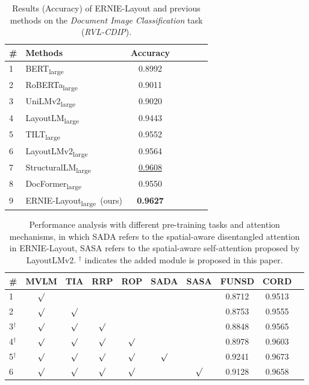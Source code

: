 \documentclass[11pt]{article}
\begin{document}
\begin{table}[t]
\centering
\small
\begin{tabular}{llccccc}
\toprule
\# & \textbf{Methods}                    & \textbf{Accuracy} \\
\midrule
1 & BERT\textsubscript{large} \cite{liu2019roberta} & 0.8992 \\
2 & RoBERTa\textsubscript{large} \cite{liu2019roberta} & 0.9011 \\
3 & UniLMv2\textsubscript{large} \cite{bao2020unilmv2} & 0.9020 \\
\midrule
4 & LayoutLM\textsubscript{large} \cite{xu2020layoutlm} & 0.9443 \\
5 & TILT\textsubscript{large} \cite{powalski2021going}  &  0.9552 \\
6 & LayoutLMv2\textsubscript{large} \cite{xu2021layoutlmv2} & 0.9564 \\
7 & StructuralLM\textsubscript{large} \cite{li2021structurallm} & \underline{0.9608} \\
8 & DocFormer\textsubscript{large}~\cite{appalaraju2021docformer} & 0.9550 \\
\midrule
\midrule
9 & ERNIE-Layout\textsubscript{large}~(ours) & \textbf{0.9627} \\ 
\bottomrule
\end{tabular}
\caption{Results (Accuracy) of ERNIE-Layout and previous methods on the \emph{Document Image Classification} task (\emph{RVL-CDIP}).}
\label{tab:main_result_document_classification}
\end{table}


\begin{table*}[ht]
\centering
\small
\begin{tabular}{lccccccccc}
\toprule
\# &\textbf{MVLM} &\textbf{TIA} &\textbf{RRP} &\textbf{ROP} & \textbf{SADA} & \textbf{SASA} & \textbf{FUNSD} & \textbf{CORD} \\
\midrule
1   & $\surd$ &  &  &  &  &  & 0.8712 &0.9513 \\
2   & $\surd$ & $\surd$ &  &  &  &  & 0.8753 &0.9555\\
\midrule
3$^{\dag}$   & $\surd$ & $\surd$ & $\surd$ &  &  &  & 0.8848 & 0.9565\\
4$^{\dag}$   & $\surd$ & $\surd$ & $\surd$ & $\surd$ &  &  & 0.8978 &0.9603\\
5$^{\dag}$   & $\surd$ & $\surd$ & $\surd$ & $\surd$ & $\surd$ & & 0.9241 &0.9673\\
\midrule
6   & $\surd$ & $\surd$ & $\surd$ & $\surd$ & & $\surd$ & 0.9128 &0.9658\\
\bottomrule
\end{tabular}
\caption{Performance analysis with different pre-training tasks and attention mechanisms, in which SADA refers to the spatial-aware disentangled attention in ERNIE-Layout, SASA refers to the spatial-aware self-attention proposed by LayoutLMv2. $^\dag$ indicates the added module is proposed in this paper.} 
\label{tab:ablation_staudy}
\end{table*}
\end{document}

